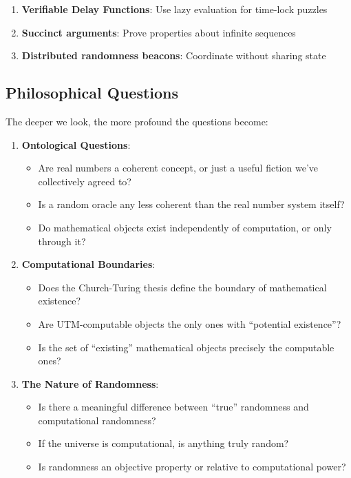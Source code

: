 \documentclass[11pt]{article}
\begin{document}
\begin{enumerate}
\item \textbf{Verifiable Delay Functions}: Use lazy evaluation for time-lock puzzles
\item \textbf{Succinct arguments}: Prove properties about infinite sequences
\item \textbf{Distributed randomness beacons}: Coordinate without sharing state
\end{enumerate}

\subsection{Philosophical Questions}

The deeper we look, the more profound the questions become:

\begin{enumerate}
\item \textbf{Ontological Questions}:
\begin{itemize}
\item Are real numbers a coherent concept, or just a useful fiction we've collectively agreed to?
\item Is a random oracle any less coherent than the real number system itself?
\item Do mathematical objects exist independently of computation, or only through it?
\end{itemize}

\item \textbf{Computational Boundaries}:
\begin{itemize}
\item Does the Church-Turing thesis define the boundary of mathematical existence?
\item Are UTM-computable objects the only ones with ``potential existence''?
\item Is the set of ``existing'' mathematical objects precisely the computable ones?
\end{itemize}

\item \textbf{The Nature of Randomness}:
\begin{itemize}
\item Is there a meaningful difference between ``true'' randomness and computational randomness?
\item If the universe is computational, is anything truly random?
\item Is randomness an objective property or relative to computational power?
\end{itemize}


\end{enumerate}
\end{document}
